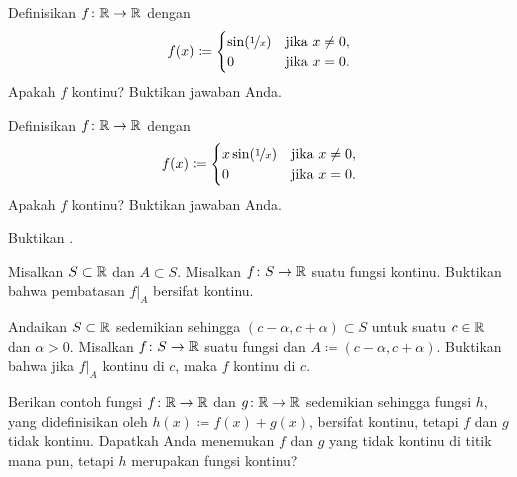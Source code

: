\begin{exercise}
Definisikan $f \colon {\mathbb{R}} \to {\mathbb{R}}$ dengan
\begin{equation*}
f(x) \coloneqq
\begin{cases}
\sin(\nicefrac{1}{x}) & \text{jika } x \neq 0, \\
0 & \text{jika } x=0.
\end{cases}
\avoidbreak
\end{equation*}
Apakah $f$ kontinu?  Buktikan jawaban Anda.
\end{exercise}

\begin{exercise}
Definisikan $f \colon {\mathbb{R}} \to {\mathbb{R}}$ dengan
\begin{equation*}
f(x) \coloneqq
\begin{cases}
x \sin(\nicefrac{1}{x}) & \text{jika } x \neq 0, \\
0 & \text{jika } x=0.
\end{cases}
\avoidbreak
\end{equation*}
Apakah $f$ kontinu?  Buktikan jawaban Anda.
\end{exercise}

\begin{exercise}
Buktikan .
\end{exercise}

\begin{exercise} \label{exercise:restrictioncontinuous}
Misalkan $S \subset {\mathbb{R}}$ dan $A \subset S$.  Misalkan $f \colon S \to {\mathbb{R}}$
suatu fungsi kontinu.
Buktikan bahwa pembatasan $f|_A$ bersifat kontinu.
\end{exercise}

\begin{exercise}
Andaikan $S \subset {\mathbb{R}}$ sedemikian sehingga $(c-\alpha,c+\alpha) \subset S$ untuk suatu $c \in {\mathbb{R}}$
dan $\alpha > 0$.
Misalkan $f \colon S \to {\mathbb{R}}$ suatu fungsi dan $A \coloneqq (c-\alpha,c+\alpha)$.  Buktikan bahwa
jika $f|_A$ kontinu di $c$, maka $f$ kontinu di $c$.
\end{exercise}

\begin{exercise}
Berikan contoh fungsi $f \colon {\mathbb{R}} \to {\mathbb{R}}$ dan $g \colon {\mathbb{R}} \to {\mathbb{R}}$
sedemikian sehingga fungsi $h$, yang didefinisikan oleh $h(x) \coloneqq f(x) + g(x)$, bersifat kontinu,
tetapi $f$ dan $g$ tidak kontinu.  Dapatkah Anda menemukan $f$ dan $g$ yang tidak kontinu
di titik mana pun, tetapi $h$ merupakan fungsi kontinu?
\end{exercise}

